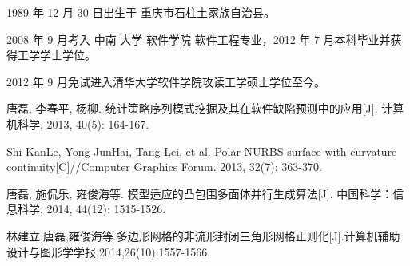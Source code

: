 \begin{resume}


  1989 年 12 月 30 日出生于 重庆市石柱土家族自治县。
  
  2008 年 9 月考入 中南 大学 软件学院 软件工程专业，2012 年 7 月本科毕业并获得工学学士学位。
  
  2012 年 9 月免试进入清华大学软件学院攻读工学硕士学位至今。


  \begin{enumerate}[{[}1{]}]
  \item 唐磊, 李春平, 杨柳. 统计策略序列模式挖掘及其在软件缺陷预测中的应用[J]. 计算机科学, 2013, 40(5): 164-167.
  \item Shi KanLe, Yong JunHai, Tang Lei, et al. Polar NURBS surface with curvature continuity[C]//Computer Graphics Forum. 2013, 32(7): 363-370.
  \item 唐磊, 施侃乐, 雍俊海等. 模型适应的凸包围多面体并行生成算法[J]. 中国科学：信息科学, 2014, 44(12): 1515-1526.
  \item 林建立,唐磊,雍俊海等.多边形网格的非流形封闭三角形网格正则化[J].计算机辅助设计与图形学学报,2014,26(10):1557-1566.
  \end{enumerate}


\end{resume}
